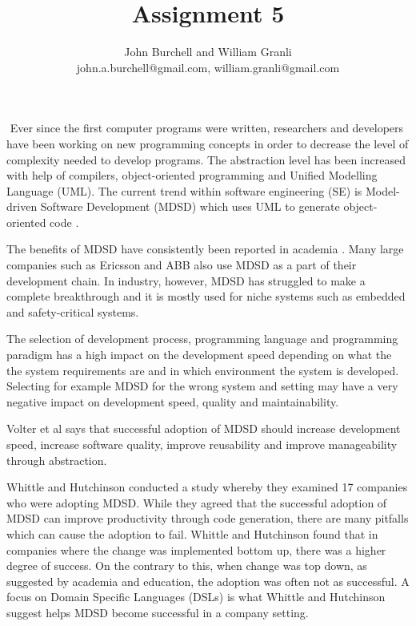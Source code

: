 \documentclass[10pt,twocolumn]{article}
\begin{document}
\title{Assignment 5}

\author{John Burchell and William Granli \\
john.a.burchell@gmail.com, william.granli@gmail.com}


\maketitle
\thispagestyle{empty}




​
Ever since the first computer programs were written, researchers and developers have been working on new programming concepts in order to decrease the level of complexity needed to develop programs. The abstraction level has been increased with help of compilers, object-oriented programming and Unified Modelling Language (UML). The current trend within software engineering (SE) is Model-driven Software Development (MDSD) which uses UML to generate object-oriented code \cite{staron2006adopting}. 

The benefits of MDSD have consistently been reported in academia \cite{staron2006adopting} \cite{volter2013model}. Many large companies such as Ericsson and ABB \cite{staron2006adopting} also use MDSD as a part of their development chain. In industry, however, MDSD has struggled to make a complete breakthrough and it is mostly used for niche systems such as embedded and safety-critical systems.


The selection of development process, programming language and programming paradigm has a high impact on the development speed depending on what the the system requirements are and in which environment the system is developed. Selecting for example MDSD for the wrong system and setting may have a very negative impact on development speed, quality and maintainability. 


Volter et al\cite{volter2013model} says that successful adoption of MDSD should increase development speed, increase software quality, improve reusability and improve manageability through abstraction.

Whittle and Hutchinson \cite{whittle2012mismatches} conducted a study whereby they examined 17 companies who were adopting MDSD. While they agreed that the successful adoption of MDSD can improve productivity through code generation, there are many pitfalls which can cause the adoption to fail. Whittle and Hutchinson found that in companies where the change was implemented bottom up, there was a higher degree of success. On the contrary to this, when change was top down, as suggested by academia and education, the adoption was often not as successful. A focus on Domain Specific Languages (DSLs) is what Whittle and Hutchinson suggest helps MDSD become successful in a company setting.
\end{document}
